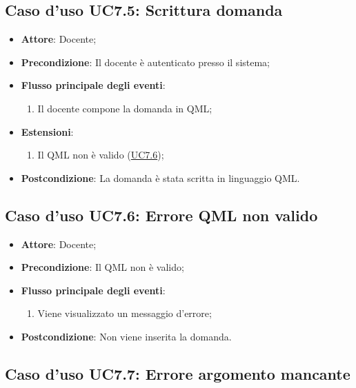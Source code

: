 \documentclass[12pt,a4paper]{article}
\begin{document}
\subsection{Caso d'uso UC7.5: Scrittura domanda}

\begin{itemize}

\item \textbf{Attore}: Docente; 
\item \textbf{Precondizione}: Il docente è autenticato presso il sistema;

\item \textbf{Flusso principale degli eventi}:
\begin{enumerate}
	\item Il docente compone la domanda in QML;
	
\end{enumerate}
\item \textbf{Estensioni}:
\begin{enumerate}
	\item Il QML non è valido (\hyperlink{UC7.6}{UC7.6});
	
\end{enumerate}
\item \textbf{Postcondizione}: La domanda è stata scritta in linguaggio QML.
\end{itemize}
\hypertarget{UC7.6}{}
\subsection{Caso d'uso UC7.6: Errore QML non valido}

\begin{itemize}

\item \textbf{Attore}: Docente; 
\item \textbf{Precondizione}: Il QML non è valido;

\item \textbf{Flusso principale degli eventi}:
\begin{enumerate}
	\item Viene visualizzato un messaggio d'errore;
	
\end{enumerate}
\item \textbf{Postcondizione}: Non viene inserita la domanda.
\end{itemize}
\hypertarget{UC7.7}{}
\subsection{Caso d'uso UC7.7: Errore argomento mancante}
\end{document}
